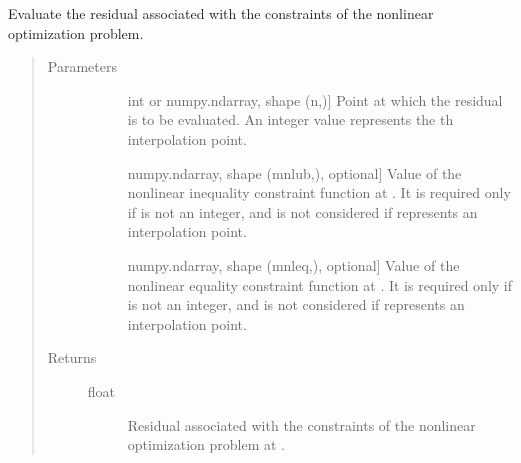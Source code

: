 \documentclass[letterpaper,10pt,english]{sphinxmanual}
\begin{document}
\begin{fulllineitems}
\begin{fulllineitems}
\label{\detokenize{refs/generated/cobyqa.optimize.Models.resid:cobyqa.optimize.Models.resid}}
\sphinxAtStartPar
Evaluate the residual associated with the constraints of the nonlinear
optimization problem.
\begin{quote}\begin{description}
\item[{Parameters}] \leavevmode\begin{description}
\item[{}] \leavevmode{[}int or numpy.ndarray, shape (n,){]}
\sphinxAtStartPar
Point at which the residual is to be evaluated. An integer value
represents the \sphinxhyphen{}th interpolation point.

\item[{}] \leavevmode{[}numpy.ndarray, shape (mnlub,), optional{]}
\sphinxAtStartPar
Value of the nonlinear inequality constraint function at . It
is required only if  is not an integer, and is not considered if
 represents an interpolation point.

\item[{}] \leavevmode{[}numpy.ndarray, shape (mnleq,), optional{]}
\sphinxAtStartPar
Value of the nonlinear equality constraint function at . It is
required only if  is not an integer, and is not considered if 
represents an interpolation point.

\end{description}

\item[{Returns}] \leavevmode\begin{description}
\item[{float}] \leavevmode
\sphinxAtStartPar
Residual associated with the constraints of the nonlinear
optimization problem at .

\end{description}

\end{description}\end{quote}


\end{fulllineitems}
\end{fulllineitems}
\end{document}
